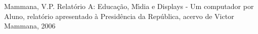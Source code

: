 \documentclass[
12pt,		%
openright,	%
twoside,  %
a4paper,			%
chapter=TITLE,		%
english,			%
french,				%
spanish,			%
brazil				%
]{USPSC-classe/USPSC}
\begin{document}
\begin{flushleft}
\begin{flushleft}
\begin{flushleft}
\begin{flushleft}
\begin{flushleft}
\begin{flushleft}
\begin{flushleft}
\begin{flushleft}
\begin{flushleft}
\begin{flushleft}
[MAMMANA, 2006] Mammana, V.P. Relat\'orio A: Educa\c{c}\~ao, M\'{\i}dia e Displays - Um computador por Aluno, relat\'orio apresentado \`a Presid\^encia da Rep\'ublica, acervo de Victor Mammana, 2006
\end{flushleft}


\end{flushleft}


\end{flushleft}


\end{flushleft}


\end{flushleft}


\end{flushleft}


\end{flushleft}


\end{flushleft}


\end{flushleft}


\end{flushleft}
\end{document}
